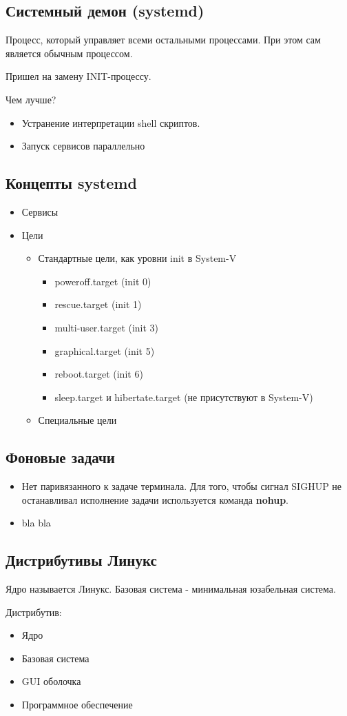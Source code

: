 \subsection{Системный демон (systemd)}

Процесс, который управляет всеми остальными процессами. При этом сам является
обычным процессом.

Пришел на замену INIT-процессу.

Чем лучше?
\begin{itemize}
	\item Устранение интерпретации shell скриптов. 
	\item Запуск сервисов параллельно
\end{itemize}

\subsection{Концепты systemd}

\begin{itemize}
	\item Сервисы
	\item Цели
		\begin{itemize}
			\item Стандартные цели, как уровни init в System-V
				\begin{itemize}
					\item poweroff.target (init 0)
					\item rescue.target (init 1)
					\item multi-user.target (init 3)
					\item graphical.target (init 5)
					\item reboot.target (init 6)
					\item sleep.target и hibertate.target (не присутствуют в System-V)
				\end{itemize}
			\item Специальные цели
		\end{itemize}
\end{itemize}

\subsection{Фоновые задачи}

\begin{itemize}
	\item Нет паривязанного к задаче терминала. Для того, чтобы сигнал SIGHUP
	не останавливал исполнение задачи используется команда \textbf{nohup}.
	\item bla bla
\end{itemize}

\subsection{Дистрибутивы Линукс}

Ядро называется Линукс. Базовая система - минимальная юзабельная система.

Дистрибутив:
\begin{itemize}
	\item Ядро
	\item Базовая система
	\item GUI оболочка
	\item Программное обеспечение 
\end{itemize}


